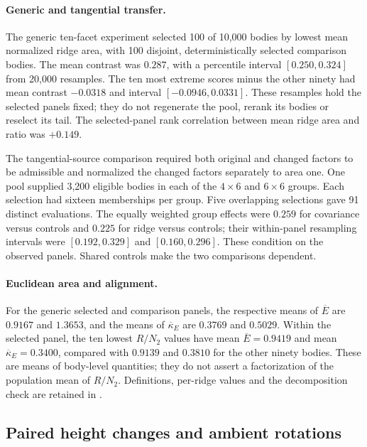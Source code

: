 \paragraph{Generic and tangential transfer.}
The generic ten-facet experiment selected 100 of 10,000 bodies by lowest
mean normalized ridge area, with 100 disjoint, deterministically selected
comparison bodies. The mean contrast was $0.287$, with a percentile
interval $[0.250,0.324]$ from 20,000 resamples. The ten most extreme
scores minus the other ninety had mean contrast $-0.0318$ and interval
$[-0.0946,0.0331]$. These resamples hold the selected panels fixed; they
do not regenerate the pool, rerank its bodies or reselect its tail.
The selected-panel rank correlation between mean ridge area and ratio
was $+0.149$.

The tangential-source comparison required both original and changed
factors to be admissible and normalized the changed factors separately to
area one. One pool supplied 3,200 eligible bodies in each of the
$4\times6$ and $6\times6$ groups. Each selection had sixteen memberships
per group. Five overlapping selections gave 91 distinct evaluations.
The equally weighted group effects were $0.259$ for covariance versus
controls and $0.225$ for ridge versus controls; their within-panel
resampling intervals were $[0.192,0.329]$ and $[0.160,0.296]$.
These condition on the observed panels. Shared controls make the two
comparisons dependent.

\paragraph{Euclidean area and alignment.}
For the generic selected and comparison panels, the respective means of
$\overline E$ are $0.9167$ and $1.3653$, and the means of
$\overline\kappa_E$ are $0.3769$ and $0.5029$. Within the selected
panel, the ten lowest $R/N_2$ values have mean $\overline E=0.9419$
and mean $\overline\kappa_E=0.3400$, compared with $0.9139$ and
$0.3810$ for the other ninety bodies. These are means of body-level
quantities; they do not assert a factorization of the population mean
of $R/N_2$. Definitions, per-ridge values and the decomposition check
are retained in
.

\subsection{Paired height changes and ambient rotations}
\label{app:ds-deformations}

